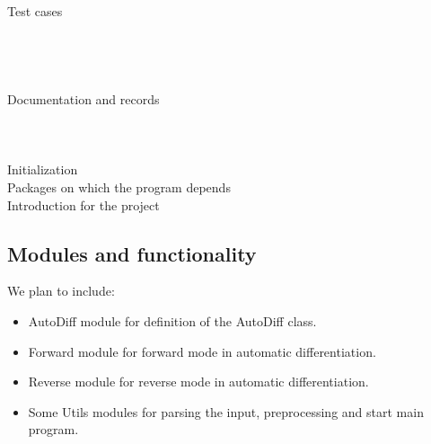 	 \hfill Test cases \\
	\hspace*{1cm}\\
	\hspace*{1cm}\\
	\hspace*{1cm}\\
	\hspace*{1cm}\\
     \hfill Documentation and records\\
          \hspace*{1cm}\\
          \hspace*{1cm}\\
          \hspace*{1cm}\\
     \hfill Initialization\\
    \hfill Packages on which the program depends\\
	 \hfill Introduction for the project
\subsection{Modules and functionality}
We plan to include: 
\begin{itemize}
    \item AutoDiff module for definition of the AutoDiff class.
    \item Forward module for forward mode in automatic differentiation.
    \item Reverse module for reverse mode in automatic differentiation.
    \item Some Utils modules for parsing the input, preprocessing and start main program.
\end{itemize}
 
